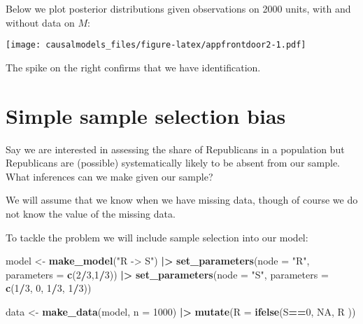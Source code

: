 \documentclass[
  12pt,
]{book}
\newenvironment{Shaded}{\begin{snugshade}}{\end{snugshade}}
\newcommand{\AttributeTok}[1]{\textcolor[rgb]{0.13,0.29,0.53}{#1}}
\newcommand{\ConstantTok}[1]{\textcolor[rgb]{0.56,0.35,0.01}{#1}}
\newcommand{\DecValTok}[1]{\textcolor[rgb]{0.00,0.00,0.81}{#1}}
\newcommand{\FunctionTok}[1]{\textcolor[rgb]{0.13,0.29,0.53}{\textbf{#1}}}
\newcommand{\NormalTok}[1]{#1}
\newcommand{\OtherTok}[1]{\textcolor[rgb]{0.56,0.35,0.01}{#1}}
\newcommand{\SpecialCharTok}[1]{\textcolor[rgb]{0.81,0.36,0.00}{\textbf{#1}}}
\newcommand{\StringTok}[1]{\textcolor[rgb]{0.31,0.60,0.02}{#1}}
\begin{document}
Below we plot posterior distributions given observations on 2000 units, with and without data on \(M\):

\texttt{[image: causalmodels\_files/figure-latex/appfrontdoor2-1.pdf]}

The spike on the right confirms that we have identification.

\hypertarget{simple-sample-selection-bias}{%
\section{Simple sample selection bias}\label{simple-sample-selection-bias}}

Say we are interested in assessing the share of Republicans in a population but Republicans are (possible) systematically likely to be absent from our sample. What inferences can we make given our sample?

We will assume that we know when we have missing data, though of course we do not know the value of the missing data.

To tackle the problem we will include sample selection into our model:

\begin{Shaded}
\begin{Highlighting}[]
\NormalTok{model }\OtherTok{\textless{}{-}} \FunctionTok{make\_model}\NormalTok{(}\StringTok{"R {-}\textgreater{} S"}\NormalTok{) }\SpecialCharTok{|\textgreater{}}
  \FunctionTok{set\_parameters}\NormalTok{(}\AttributeTok{node =} \StringTok{"R"}\NormalTok{, }\AttributeTok{parameters =} \FunctionTok{c}\NormalTok{(}\DecValTok{2}\SpecialCharTok{/}\DecValTok{3}\NormalTok{,}\DecValTok{1}\SpecialCharTok{/}\DecValTok{3}\NormalTok{)) }\SpecialCharTok{|\textgreater{}}
  \FunctionTok{set\_parameters}\NormalTok{(}\AttributeTok{node =} \StringTok{"S"}\NormalTok{, }\AttributeTok{parameters =} \FunctionTok{c}\NormalTok{(}\DecValTok{1}\SpecialCharTok{/}\DecValTok{3}\NormalTok{, }\DecValTok{0}\NormalTok{, }\DecValTok{1}\SpecialCharTok{/}\DecValTok{3}\NormalTok{, }\DecValTok{1}\SpecialCharTok{/}\DecValTok{3}\NormalTok{))}

\NormalTok{data }\OtherTok{\textless{}{-}} \FunctionTok{make\_data}\NormalTok{(model, }\AttributeTok{n =} \DecValTok{1000}\NormalTok{) }\SpecialCharTok{|\textgreater{}}
        \FunctionTok{mutate}\NormalTok{(}\AttributeTok{R =} \FunctionTok{ifelse}\NormalTok{(S}\SpecialCharTok{==}\DecValTok{0}\NormalTok{, }\ConstantTok{NA}\NormalTok{, R ))}
\end{Highlighting}
\end{Shaded}
\end{document}
